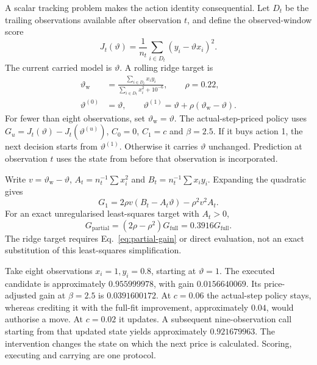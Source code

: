 A scalar tracking problem makes the action identity consequential. Let \(D_t\) be the trailing observations available after observation \(t\), and define the observed-window score
\begin{equation}
 J_t(\vartheta)=\frac1{n_t}\sum_{i\in D_t}
                         (y_i-\vartheta x_i)^2 .
 \label{eq:window-score}
\end{equation}
The current carried model is \(\vartheta\). A rolling ridge target is
\begin{align}
 \vartheta_{\mathrm w}&=
 \frac{\sum_{i\in D_t}x_iy_i}{\sum_{i\in D_t}x_i^2+10^{-6}},
 \qquad \rho=0.22,\nonumber\\
 \vartheta^{(0)}&=\vartheta,\qquad
 \vartheta^{(1)}=\vartheta+\rho(\vartheta_{\mathrm w}-\vartheta).
 \label{eq:actions}
\end{align}
For fewer than eight observations, set \(\vartheta_{\mathrm w}=\vartheta\). The actual-step-priced policy uses
\(G_u=J_t(\vartheta)-J_t(\vartheta^{(u)})\),
\(C_0=0\), \(C_1=c\) and \(\beta=2.5\). If it buys action 1, the next decision starts from \(\vartheta^{(1)}\). Otherwise it carries \(\vartheta\) unchanged. Prediction at observation \(t\) uses the state from before that observation is incorporated.

Write \(v=\vartheta_{\mathrm w}-\vartheta\),
\(A_t=n_t^{-1}\sum x_i^2\) and
\(B_t=n_t^{-1}\sum x_iy_i\). Expanding the quadratic gives
\begin{equation}
 G_1=2\rho v(B_t-A_t\vartheta)-\rho^2v^2A_t .
 \label{eq:partial-gain}
\end{equation}
For an exact unregularised least-squares target with \(A_t>0\),
\begin{equation}
 G_{\mathrm{partial}}=(2\rho-\rho^2)G_{\mathrm{full}}
                     =0.3916G_{\mathrm{full}} .
 \label{eq:partial-factor}
\end{equation}
The ridge target requires Eq.~\eqref{eq:partial-gain} or direct evaluation, not an exact substitution of this least-squares simplification.

Take eight observations \(x_i=1,y_i=0.8\), starting at \(\vartheta=1\). The executed candidate is approximately \(0.955999978\), with gain \(0.0156640069\). Its price-adjusted gain at \(\beta=2.5\) is \(0.0391600172\). At \(c=0.06\) the actual-step policy stays, whereas crediting it with the full-fit improvement, approximately \(0.04\), would authorise a move. At \(c=0.02\) it updates. A subsequent nine-observation call starting from that updated state yields approximately \(0.921679963\). The intervention changes the state on which the next price is calculated. Scoring, executing and carrying are one protocol.

